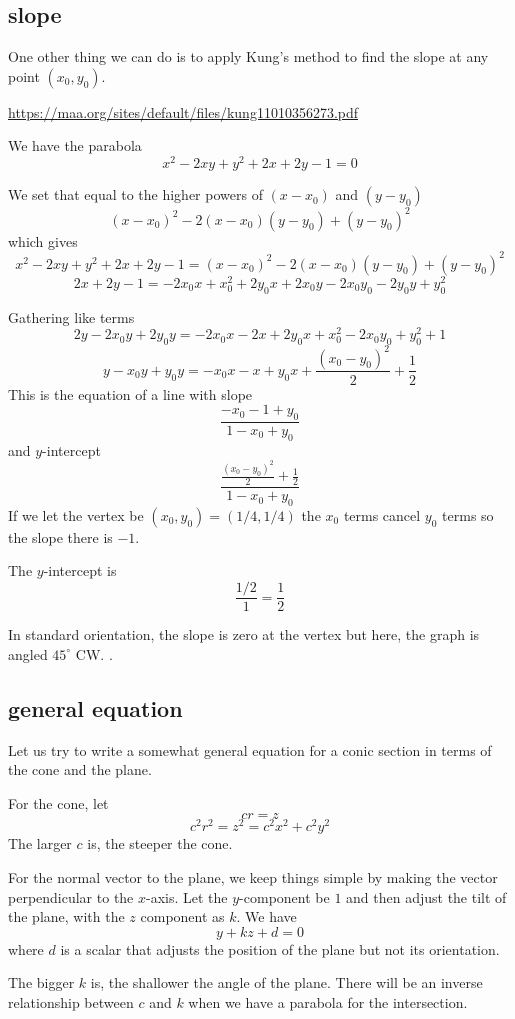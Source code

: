\documentclass[11pt, oneside]{article}
\begin{document}
\subsection*{slope}
One other thing we can do is to apply Kung's method to find the slope at any point $(x_0,y_0)$.

\url{https://maa.org/sites/default/files/kung11010356273.pdf}

We have the parabola
\[ x^2 - 2xy + y^2 + 2x + 2y - 1 = 0 \]

We set that equal to the higher powers of $(x-x_0)$ and $(y-y_0)$
\[ (x-x_0)^2 - 2(x-x_0)(y-y_0) + (y-y_0)^2 \]
which gives
\[ x^2 - 2xy + y^2 + 2x + 2y - 1 = (x-x_0)^2 - 2(x-x_0)(y-y_0) + (y-y_0)^2 \]
\[ 2x + 2y - 1 = -2x_0x + x_0^2 + 2y_0x + 2x_0y - 2x_0y_0 -2 y_0y + y_0^2 \]

Gathering like terms
\[ 2y - 2x_0y + 2y_0y = -2x_0 x - 2x + 2y_0x + x_0^2 - 2x_0y_0 + y_0^2 + 1 \]
\[ y - x_0y + y_0y = -x_0 x - x + y_0x + \frac{(x_0 - y_0)^2}{2} + \frac{1}{2} \]
This is the equation of a line with slope
\[ \frac{-x_0 - 1 + y_0}{1 - x_0 + y_0} \]
and $y$-intercept
\[ \frac{ \frac{(x_0 - y_0)^2}{2}  + \frac{1}{2}}{1 - x_0 + y_0} \]
If we let the vertex be $(x_0,y_0) = (1/4,1/4)$ the $x_0$ terms cancel $y_0$ terms so the slope there is $-1$.

The $y$-intercept is
\[ \frac{1/2}{1} = \frac{1}{2}  \]

In standard orientation, the slope is zero at the vertex but here, the graph is angled $45^{\circ}$ CW.
.
\subsection*{general equation}

Let us try to write a somewhat general equation for a conic section in terms of the cone and the plane.

For the cone, let 
\[ cr = z \]
\[ c^2 r^2 = z^2 = c^2 x^2 + c^2 y^2 \]
The larger $c$ is, the steeper the cone.

For the normal vector to the plane, we keep things simple by making the vector perpendicular to the $x$-axis.  Let the $y$-component be $1$ and then adjust the tilt of the plane, with the $z$ component as $k$.  We have
\[  y + kz + d = 0 \]
where $d$ is a scalar that adjusts the position of the plane but not its orientation.

The bigger $k$ is, the shallower the angle of the plane.  There will be an inverse relationship between $c$ and $k$ when we have a parabola for the intersection.
\end{document}
